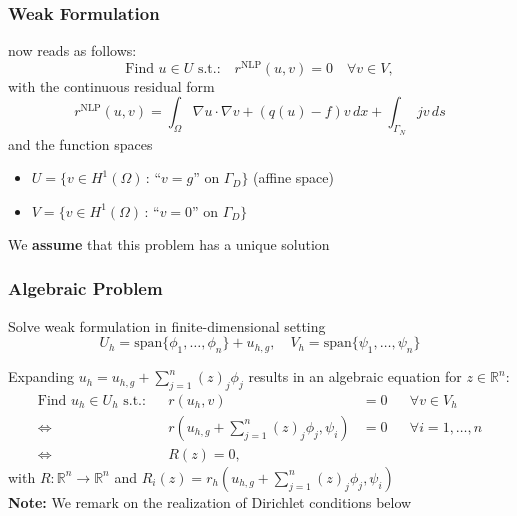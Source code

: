 \documentclass[aspectratio=169,11pt]{beamer}
\theoremstyle{definition}
\begin{document}
\begin{frame}
\frametitle{Weak Formulation}
now reads as follows:
\begin{equation}
\text{Find $u\in U$ s.t.:} \quad r^{\text{NLP}}(u,v)=0 \quad \forall v\in V,
\label{Eq:BasicBuildingBlock}
\end{equation}
with the continuous residual form
\begin{equation*}
r^{\text{NLP}}(u,v) = \int_\Omega \nabla u \cdot \nabla v + (q(u)-f)v\,dx + \int_{\Gamma_N} jv\,ds
\label{eq:ResidualForm}
\end{equation*}
and the function spaces
\begin{itemize}
\item $U= \{v\in H^1(\Omega) \,:\, \text{``$v=g$'' on $\Gamma_D$}\}$ (affine space)
\item $V= \{v\in H^1(\Omega) \,:\, \text{``$v=0$'' on $\Gamma_D$}\}$
\end{itemize}
\medskip
We \textbf{assume} that this problem has a unique solution
\end{frame}

\begin{frame}
\frametitle{Algebraic Problem}
\rightarrownice Solve weak formulation in finite-dimensional setting
\begin{equation*}
U_h=\text{span}\{\phi_1,\ldots,\phi_n\} + u_{h,g}, \quad V_h=\text{span}\{\psi_1,\ldots,\psi_n\}
\end{equation*}

Expanding $u_h=u_{h,g} + \sum_{j=1}^n (z)_j\phi_j$
results in an algebraic equation for $z\in\mathbb{R}^n$:
\begin{align*}
\text{Find $u_h\in U_h$ s.t.:} && r(u_h,v)&=0 && \forall v\in V_h\\
\Leftrightarrow{} && r\left(u_{h,g} +\sum_{j=1}^n (z)_j\phi_j,\psi_i\right) &= 0 &&\forall i=1,\ldots,n\\
\Leftrightarrow{} && R(z) = 0,
\end{align*}
with $R: \mathbb{R}^n \to \mathbb{R}^n$ and $R_i(z) = r_h\left(u_{h,g} +\sum_{j=1}^n (z)_j\phi_j,\psi_i\right)$ \\
\medskip
\textbf{Note:} We remark on the realization of Dirichlet conditions below
\end{frame}
\end{document}
